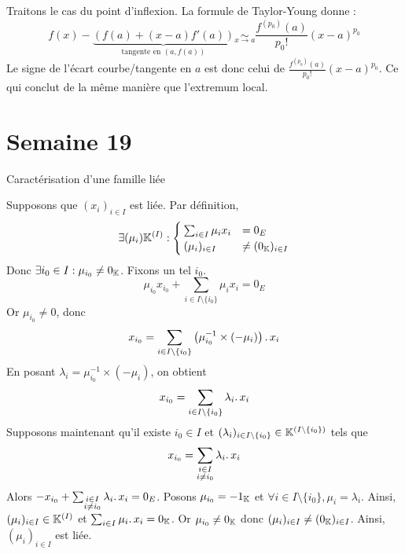 \documentclass{article}
\renewenvironment{question_kholle}[2][ ]
{
	\subsection{\texorpdfstring{#2}{}}
	\notblank{#1}
	{
		\noindent #1
		\bigbreak
	}
	{}
	\begin{proof}
}
{
	\end{proof}
}
\begin{document}
\begin{question_kholle}
	Traitons le cas du point d'inflexion. La formule de Taylor-Young donne :
	\begin{equation}
		f(x) - \underbrace{\left( f(a) + (x-a)f'(a) \right)}_{\text{tangente en } (a,f(a))}
		\underset{x \rightarrow a}{\sim} \frac{f^{(p_0)}(a)}{p_0!} (x-a)^{p_0}
	\end{equation}
	Le signe de l'écart courbe/tangente en $a$ est donc celui de $\frac{f^{(p_0)}(a)}{p_0!} (x-a)^{p_0}$. Ce qui conclut de la même manière que l'extremum local.
\end{question_kholle}

\pagebreak\section{Semaine 19}

\begin{question_kholle}
	[Une famille est liée si et seulement si l'un de ses vecteurs est une combinaison linéaires d'autres vecteurs de la famille.
		\begin{equation}
			(x_i)_{i \in I} \text{ est liée}
			\iff \exists i_0 \in I : \exists (\lambda_i)_{i \in I\setminus\{i_0\}} \in \K^{\left( I \setminus \{i_0\} \right)} :
			x_{i_0} = \sum_{\substack{i \in I \\ i \neq i_0}} \lambda_i \ldotp x_i
		\end{equation}]
	{Caractérisation d'une famille liée}

	Supposons que $(x_i)_{i \in I}$ est liée.
	Par définition,
	\[
		\displaystyle \exists (\mu_i) \mathbb K^{(I)} :
		\begin{cases}
			\sum_{i\in I}\mu_{i} x_{i} & =0_{E}                 \\
			(\mu_{i})_{i\in I}         & \neq (0_{\mathbb K})_{i\in I}
		\end{cases}
	\]
	Donc $\exists i_0 \in I : \mu_{i_0} \neq 0_{\mathbb K}$. Fixons un tel $i_0$. \\
	\[
		\mu_{i_0} x_{i_0} + \sum_{i \in I \setminus \{i_0\}} \mu_i x_i = 0_E
	\]
	Or $\mu_{i_0} \neq 0$, donc
	\[
		\displaystyle x_{i_0} = \sum_{i \in I \setminus \{i_0\}} \left( \mu_{i_0}^{-1} \times (-\mu_i) \right) \ldotp x_i
	\]
	En posant $\lambda_i = \mu_{i_0}^{-1} \times (-\mu_i)$, on obtient
	\[
		x_{i_0} = \displaystyle \sum_{i \in I \setminus \{i_0\}} \lambda_i \ldotp x_i
	\]
	Supposons maintenant qu’il existe $i_0 \in I$ et $(\lambda_i)_{i \in I\setminus\{i_0\}} \in \mathbb K^{\left( I \setminus \{i_0\} \right)}$ tels que
	\[
		x_{i_0} = \sum_{\substack{i \in I \\ i \neq i_0}} \lambda_i \ldotp x_i
	\]
	Alors $-x_{i_0} + \sum_{\substack{i \in I \\ i \neq i_0}} \lambda_i \ldotp x_i = 0_E$.
	Posons $\mu_{i_0} = - 1_{\mathbb K}$ et $\forall i \in I \!\setminus\! \{i_0\}, \mu_i = \lambda_i$.
	Ainsi, $(\mu_i)_{i \in I} \in \mathbb K^{(I)}$ et $\sum_{i \in I} \mu_i \ldotp x_i = 0_{\mathbb K}$. Or $\mu_{i_0} \neq 0_{\mathbb K}$ donc $(\mu_i)_{i \in I} \neq (0_{\mathbb K})_{i \in I}$.
	Ainsi, $(\mu_i)_{i \in I}$ est liée.
\end{question_kholle}
\end{document}
